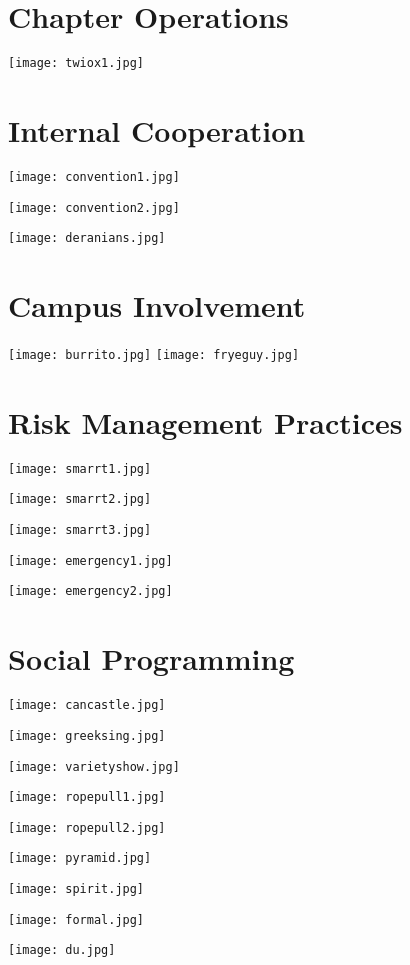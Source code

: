 \documentclass[a4paper,10pt]{article}
\begin{document}
  \section{Chapter Operations}
    \texttt{[image: twiox1.jpg]}
    
    
    
    
  \newpage
  \section{Internal Cooperation}
    \texttt{[image: convention1.jpg]}
    
    
    \texttt{[image: convention2.jpg]}
    
    
    \texttt{[image: deranians.jpg]}
    
  
  \newpage
  \section{Campus Involvement}
    \texttt{[image: burrito.jpg]}
    \texttt{[image: fryeguy.jpg]}
    
    
    \newpage
  \section{Risk Management Practices}
    
    
    
    
    \texttt{[image: smarrt1.jpg]}
    
    \texttt{[image: smarrt2.jpg]}
    
    \texttt{[image: smarrt3.jpg]}
    
    \texttt{[image: emergency1.jpg]}
    
    \texttt{[image: emergency2.jpg]}
  
  \newpage
  \section{Social Programming}
    \texttt{[image: cancastle.jpg]}
    
    \texttt{[image: greeksing.jpg]}
    
    \texttt{[image: varietyshow.jpg]}
    
    \texttt{[image: ropepull1.jpg]}
    
    \texttt{[image: ropepull2.jpg]}
    
    \texttt{[image: pyramid.jpg]}
    
    \texttt{[image: spirit.jpg]}

    \texttt{[image: formal.jpg]}
    
    \texttt{[image: du.jpg]}
    
    
    
    
    
    
    
    
\end{document}

